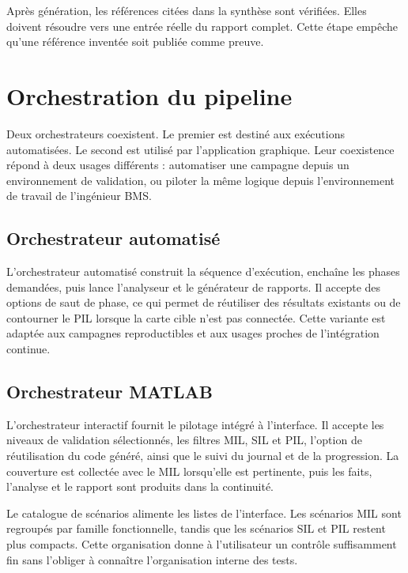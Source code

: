 Après génération, les références citées dans la synthèse sont vérifiées. Elles doivent résoudre vers une entrée réelle du rapport complet. Cette étape empêche qu'une référence inventée soit publiée comme preuve.

\section{Orchestration du pipeline}
\label{sec:ch5_orchestrateur}

Deux orchestrateurs coexistent. Le premier est destiné aux exécutions automatisées. Le second est utilisé par l'application graphique. Leur coexistence répond à deux usages différents : automatiser une campagne depuis un environnement de validation, ou piloter la même logique depuis l'environnement de travail de l'ingénieur BMS.

\subsection{Orchestrateur automatisé}
\label{subsec:ch5_orch_python}

L'orchestrateur automatisé construit la séquence d'exécution, enchaîne les phases demandées, puis lance l'analyseur et le générateur de rapports. Il accepte des options de saut de phase, ce qui permet de réutiliser des résultats existants ou de contourner le PIL lorsque la carte cible n'est pas connectée. Cette variante est adaptée aux campagnes reproductibles et aux usages proches de l'intégration continue.

\subsection{Orchestrateur MATLAB}
\label{subsec:ch5_orch_matlab}

L'orchestrateur interactif fournit le pilotage intégré à l'interface. Il accepte les niveaux de validation sélectionnés, les filtres MIL, SIL et PIL, l'option de réutilisation du code généré, ainsi que le suivi du journal et de la progression. La couverture est collectée avec le MIL lorsqu'elle est pertinente, puis les faits, l'analyse et le rapport sont produits dans la continuité.

\noindent
Le catalogue de scénarios alimente les listes de l'interface. Les scénarios MIL sont regroupés par famille fonctionnelle, tandis que les scénarios SIL et PIL restent plus compacts. Cette organisation donne à l'utilisateur un contrôle suffisamment fin sans l'obliger à connaître l'organisation interne des tests.

